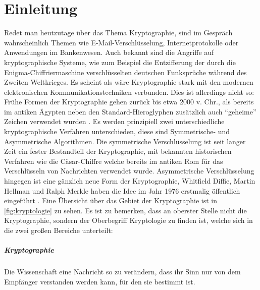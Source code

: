 \chapter{Einleitung}
Redet man heutzutage über das Thema Kryptographie, sind im Gespräch wahrscheinlich
Themen wie E-Mail-Verschlüsselung, Internetprotokolle oder Anwendungen im
Bankenwesen. Auch bekannt sind die Angriffe auf kryptographische Systeme,
wie zum Beispiel die Entzifferung der durch die Enigma-Chiffriermaschine
verschlüsselten deutschen Funksprüche während des Zweiten Weltkrieges. Es scheint als
wäre Kryptographie stark mit den modernen elektronischen Kommunikationstechniken
verbunden. Dies ist allerdings nicht so: Frühe Formen der Kryptographie
gehen zurück bis etwa 2000 v. Chr., als bereits im antiken Ägypten neben den
Standard-Hieroglyphen zusätzlich auch \enquote{geheime} Zeichen
verwendet wurden \parencite[2]{BOOK:KRYPTOGRAPHIE}. Es werden prinzipiell zwei
unterschiedliche kryptographische Verfahren unterschieden, diese sind
Symmetrische- und Asymmetrische Algorithmen. Die symmetrische Verschlüsselung ist
seit langer Zeit ein fester Bestandteil der Kryptographie, mit bekannten historischen
Verfahren wie die Cäsar-Chiffre welche bereits im antiken Rom für das Verschlüsseln von
Nachrichten verwendet wurde. Asymmetrische Verschlüsselung hingegen ist eine gänzlich neue Form
der Kryptographie, Whitfield Diffie, Martin Hellman und Ralph Merkle haben die Idee im Jahr
1976 erstmalig öffentlich eingeführt \parencite[3]{BOOK:KRYPTOGRAPHIE}.
Eine Übersicht über das Gebiet der Kryptographie ist in \autoref{fig:kryptologie} zu sehen.
Es ist zu bemerken, dass an oberster Stelle nicht die Kryptographie, sondern
der Oberbegriff Kryptologie zu finden ist, welche sich in die zwei großen Bereiche unterteilt:

\paragraph{Kryptographie}
Die Wissenschaft eine Nachricht so zu verändern, dass ihr Sinn nur von dem Empfänger
verstanden werden kann, für den sie bestimmt ist.

